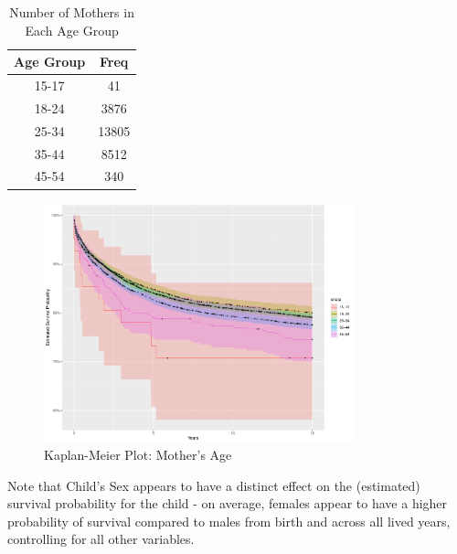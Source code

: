 \documentclass[12pt,letterpaper]{article}
\begin{document}


\begin{table}[!ht]
	\centering
	\begin{tabular}{cc}
		\hline
		Age Group & Freq \\ 
		\hline
		15-17 &  41 \\ 
		18-24 & 3876 \\ 
		25-34 & 13805 \\ 
		35-44 & 8512 \\ 
		45-54 & 340 \\ 
		\hline
	\end{tabular}
	\caption{Number of Mothers in Each Age Group}
\end{table}



\begin{figure}[!htpb]
	\centering
	\includegraphics[width=0.8\textwidth]{age.pdf}
	\caption{Kaplan-Meier Plot: Mother's Age}
	\label{fig:age}
\end{figure}

\vspace{.25cm}
\noindent Note that Child's Sex appears to have a distinct effect on the (estimated) survival probability for the child - on average, females appear to have a higher probability of survival compared to males from birth and across all lived years, controlling for all other variables.


\end{document}
